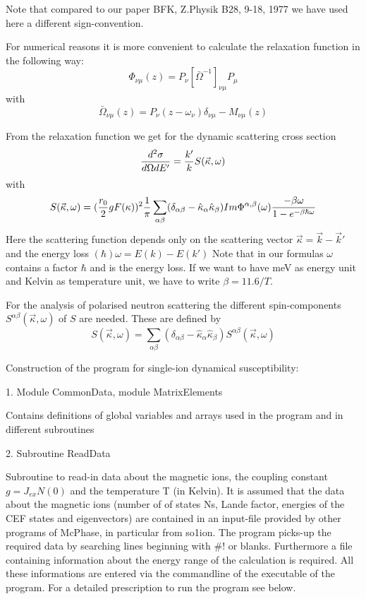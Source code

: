 Note that compared to our paper BFK, Z.Physik B28, 9-18, 1977 we have used here 
a different sign-convention.

For numerical reasons it is more convenient to calculate the relaxation
function in the following way:
$$
\Phi_{\nu\mu}(z)= P_\nu[\bar\Omega^{-1}]_{\nu\mu}P_\mu      
$$
with
$$
\bar \Omega_{\nu\mu}(z)= P_\nu(z-\omega_\nu)\delta_{\nu\mu}  - M_{\nu\mu}(z)
$$

From the relaxation function we get for the dynamic scattering cross section 
$$
{d^2\sigma \over d\Omega d E'} =  {k' \over
k}S(\vec \kappa,\omega)
$$
with
$$
S(\vec \kappa, \omega)=({r_0\over 2}g F(\kappa))^2{1\over \pi }
\sum_{\alpha\beta}(\delta_{\alpha\beta} 
- \hat \kappa_\alpha \hat \kappa_\beta)
Im \Phi^{\alpha,\beta}(\omega){-\beta \omega \over 1-e^{-\beta \hbar \omega}} 
$$
Here the scattering function depends only on the scattering vector
$\vec \kappa= \vec k - \vec k'$ and the energy loss $(\hbar)\omega =E(k)-E(k')$
Note that in our formulas $\omega$ contains a factor $\hbar$ and is the
energy loss. If we want to have meV as energy unit and Kelvin as temperature
unit, we have to write $\beta= 11.6/T$.
   
For the analysis of polarised neutron scattering the different
spin-components $S^{\alpha\beta}(\vec \kappa,\omega)$ of $S$ are needed. 
These are defined by
$$
S(\vec \kappa,\omega)= \sum_{\alpha\beta}(\delta_{\alpha\beta} 
- \hat \kappa_\alpha \hat \kappa_\beta)S^{\alpha\beta}(\vec \kappa,\omega)
$$


\bigskip
\newpage

\vfill
\eject
\parindent=0pt
{\large Construction of the program for single-ion dynamical susceptibility:}


1. Module CommonData, module MatrixElements

Contains definitions of global variables and arrays used in the program and
in different  subroutines 

2. Subroutine ReadData

Subroutine to read-in data about the magnetic ions, the coupling 
constant $g=J_{ex} N(0)$ and the temperature  T (in Kelvin). 
It is assumed that the data about the
magnetic ions (number of of states Ns, Lande factor, energies of the 
CEF states and 
eigenvectors) are contained in an input-file provided by other 
programs of McPhase, in particular from so1ion. The program picks-up the
required data by searching lines beginning with \#! or blanks. Furthermore a file
containing information about the energy range of the calculation is
required. All these informations are entered via the commandline of the
executable of the program. For a detailed prescription to run the program see below.


